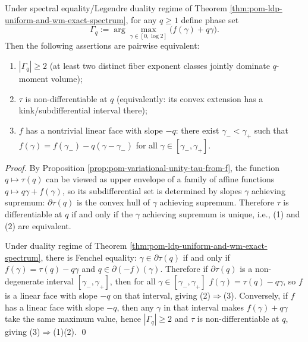 \begin{proposition}\label{prop:pom-phase-transition-kink-vs-linear-face}
Under spectral equality/Legendre duality regime of Theorem \ref{thm:pom-ldp-uniform-and-wm-exact-spectrum},
for any \(q\ge 1\) define phase set
\[
\Gamma_q:=\arg\max_{\gamma\in[0,\log 2]}\bigl(f(\gamma)+q\gamma\bigr).
\]
Then the following assertions are pairwise equivalent:
\begin{enumerate}
  \item \(|\Gamma_q|\ge 2\) (at least two distinct fiber exponent classes jointly dominate \(q\)-moment volume);
  \item \(\tau\) is non-differentiable at \(q\) (equivalently: its convex extension has a kink/subdifferential interval there);
  \item \(f\) has a nontrivial linear face with slope \(-q\): there exist \(\gamma_-<\gamma_+\) such that
  \(
  f(\gamma)=f(\gamma_-)-q(\gamma-\gamma_-)
  \)
  for all \(\gamma\in[\gamma_-,\gamma_+]\).
\end{enumerate}
\end{proposition}
\begin{proof}
By Proposition \ref{prop:pom-variational-unity-tau-from-f}, the function \(q\mapsto\tau(q)\) can be viewed as upper envelope of a family of affine functions \(q\mapsto q\gamma+f(\gamma)\), so its subdifferential set is determined by slopes \(\gamma\) achieving supremum: \(\partial\tau(q)\) is the convex hull of \(\gamma\) achieving supremum.
Therefore \(\tau\) is differentiable at \(q\) if and only if the \(\gamma\) achieving supremum is unique, i.e., (1) and (2) are equivalent.
\par
Under duality regime of Theorem \ref{thm:pom-ldp-uniform-and-wm-exact-spectrum},
there is Fenchel equality: \(\gamma\in\partial\tau(q)\) if and only if \(f(\gamma)=\tau(q)-q\gamma\) and \(q\in\partial(-f)(\gamma)\).
Therefore if \(\partial\tau(q)\) is a non-degenerate interval \([\gamma_-,\gamma_+]\), then for all \(\gamma\in[\gamma_-,\gamma_+]\)
\(
f(\gamma)=\tau(q)-q\gamma
\), so \(f\) is a linear face with slope \(-q\) on that interval, giving (2)\(\Rightarrow\)(3).
Conversely, if \(f\) has a linear face with slope \(-q\), then any \(\gamma\) in that interval makes \(f(\gamma)+q\gamma\) take the same maximum value, hence \(|\Gamma_q|\ge 2\) and \(\tau\) is non-differentiable at \(q\), giving (3)\(\Rightarrow\)(1)(2). \qed
\end{proof}

